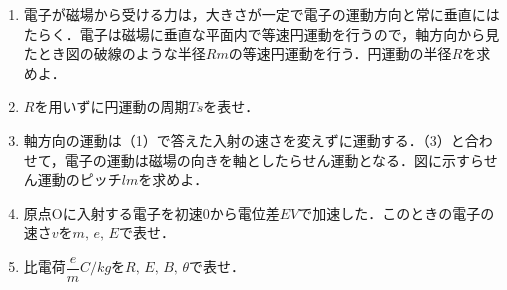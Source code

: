 \begin{enumerate}[（1）]
  \setlength{\leftskip}{-1.5zw}
  \setlength{\itemindent}{1zw}\setlength{\labelsep}{0.5zw}
  \setlength{\labelwidth}{1zw}\setlength{\leftmargin}{1zw}
  \setlength{\itemsep}{0.5\baselineskip}
  \setcounter{enumi}{2}
  \item 電子が磁場から受ける力は，大きさが一定で電子の運動方向と常に垂直にはたらく．電子は磁場に垂直な平面内で等速円運動を行うので，\z 軸方向から見たとき図の破線のような半径$R\unit{m}$の等速円運動を行う．円運動の半径$R$を求めよ．
  \item $R$を用いずに円運動の周期$T\unit{s}$を表せ．
  \item \z 軸方向の運動は（1）で答えた入射の速さを変えずに運動する．（3）と合わせて，電子の運動は磁場の向きを軸としたらせん運動となる．図に示すらせん運動のピッチ$l\unit{m}$を求めよ．
  \item 原点Oに入射する電子を初速0から電位差$E\unit{V}$で加速した．このときの電子の速さ$v$を$m,\,e,\,E$で表せ．
  \item 比電荷$\dfrac{e}{m}\unit{C/kg}$を$R,\,E,\,B,\,\theta$で表せ．
\end{enumerate}

